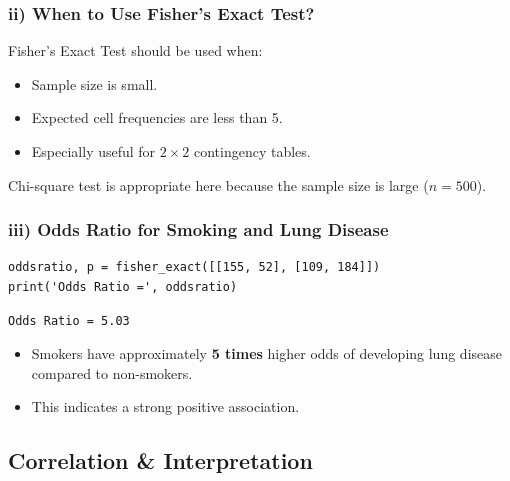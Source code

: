 \documentclass[12pt,a4paper]{article}
\begin{document}
\subsubsection{ii) When to Use Fisher's Exact Test?}

\begin{interpbox}
Fisher's Exact Test should be used when:
\begin{itemize}[noitemsep]
  \item Sample size is small.
  \item Expected cell frequencies are less than 5.
  \item Especially useful for $2 \times 2$ contingency tables.
\end{itemize}
Chi-square test is appropriate here because the sample size is large ($n = 500$).
\end{interpbox}

\subsubsection{iii) Odds Ratio for Smoking and Lung Disease}

\begin{lstlisting}
oddsratio, p = fisher_exact([[155, 52], [109, 184]])
print('Odds Ratio =', oddsratio)
\end{lstlisting}

\begin{outputbox}
\begin{verbatim}
Odds Ratio = 5.03
\end{verbatim}
\end{outputbox}

\begin{interpbox}
\begin{itemize}[noitemsep]
  \item Smokers have approximately \textbf{5 times} higher odds of developing lung disease compared to non-smokers.
  \item This indicates a strong positive association.
\end{itemize}
\end{interpbox}

\subsection{Correlation \& Interpretation}
\end{document}
